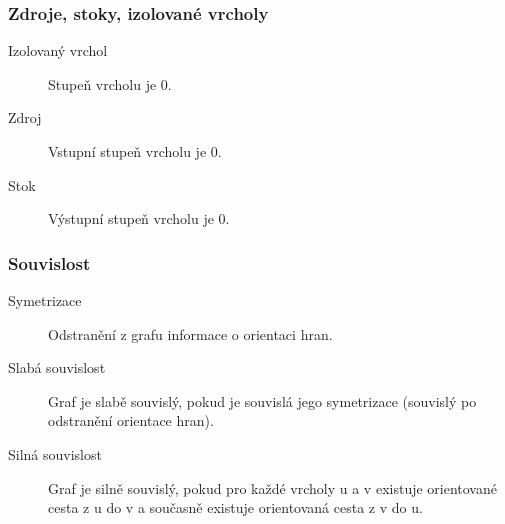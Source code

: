     \subsubsection{Zdroje, stoky, izolované vrcholy}
      \begin{description}
        \item[Izolovaný vrchol] Stupeň vrcholu je 0.
        \item[Zdroj] Vstupní stupeň vrcholu je 0.
        \item[Stok] Výstupní stupeň vrcholu je 0.
      \end{description}

    \subsubsection{Souvislost}
      \begin{description}
        \item[Symetrizace] Odstranění z grafu informace o orientaci hran.
        \item[Slabá souvislost] Graf je slabě souvislý, pokud je souvislá jego symetrizace (souvislý po odstranění orientace hran).
        \item[Silná souvislost] Graf je silně souvislý, pokud pro každé vrcholy u a v existuje orientované cesta z u do v a současně existuje orientovaná cesta z v do u.
      \end{description}
